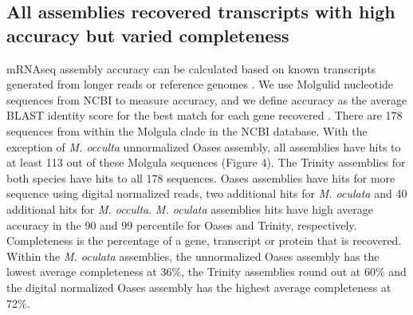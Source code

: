 \documentclass[fleqn,10pt]{wlpeerj}
\begin{document}
\subsection{All assemblies recovered transcripts with high accuracy but varied completeness}
mRNAseq assembly accuracy can be calculated based on known transcripts generated from longer reads or reference genomes \citep{vijay_challenges_2012,martin_next-generation_2011}. We use Molgulid nucleotide sequences from NCBI to measure accuracy, and we define accuracy as the average BLAST identity score for the best match for each gene recovered \citep{li_sequence_2009}. There are 178 sequences from within the Molgula clade in the NCBI database. With the exception of \textit{M. occulta} unnormalized Oases assembly, all assemblies have hits to at least 113 out of these Molgula sequences (Figure 4). The Trinity assemblies for both species have hits to all 178 sequences. Oases assemblies have hits for more sequence using digital normalized reads, two additional hits for \textit{M. oculata} and 40 additional hits for \textit{M. occulta}. \textit{M. oculata} assemblies hits have high average accuracy in the 90 and 99 percentile for Oases and Trinity, respectively. Completeness is the percentage of a gene, transcript or protein that is recovered. Within the \textit{M. oculata} assemblies, the unnormalized Oases assembly has the lowest average completeness at 36\%, the Trinity assemblies round out at 60\% and the digital normalized Oases assembly has the highest average completeness at 72\%.
\end{document}
